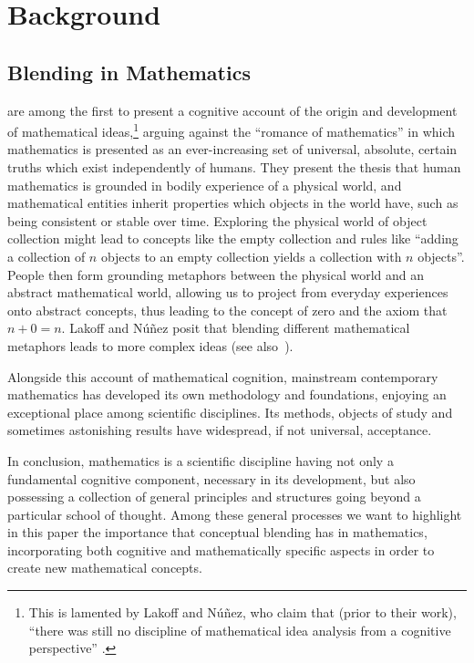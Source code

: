 \section{Background}
\label{sec:background}

\subsection{Blending in Mathematics}
\label{subsec:mathblend}

\textcite{Lak00} 
are among the first to present
a cognitive account of the origin and development of mathematical
ideas,\footnote{This is lamented by Lakoff and N{\'u}{\~n}ez, who
claim that (prior to their work), ``there was still no discipline of
mathematical idea analysis from a cognitive perspective''
\citep{Lak00}.} arguing against the ``romance of mathematics'' in which
mathematics is presented as an ever-increasing set of universal,
absolute, certain truths which exist independently of humans. They
present the thesis that human mathematics is grounded in bodily
experience of a physical world, and mathematical entities inherit
properties which objects in the world have, such as being consistent
or stable over time.  Exploring the physical world of object
collection might lead to concepts like the empty collection and rules
like ``adding a collection of $n$ objects to an empty collection
yields a collection with $n$ objects''. People then form grounding
metaphors between the physical world and an abstract mathematical
world, allowing us to project from everyday experiences onto abstract
concepts, thus leading to the concept of zero and the axiom that $n +
0 = n$. Lakoff and N{\'u}{\~n}ez posit that blending different
mathematical metaphors leads to more complex ideas (see
also~\textcite{alexander11}). 

Alongside this account of mathematical cognition, mainstream
contemporary mathematics has developed its own methodology and
foundations, enjoying an exceptional place among scientific
disciplines. Its methods, objects of study and sometimes astonishing
results have widespread, if not universal, acceptance.

In conclusion, mathematics is a scientific discipline having not only
a fundamental cognitive component, necessary in its development, but
also possessing a collection of general principles and structures
going beyond a particular school of thought.  Among these general
processes we want to highlight in this paper the importance that
conceptual blending has in mathematics, incorporating both cognitive and
mathematically specific aspects in order to create new mathematical concepts.


